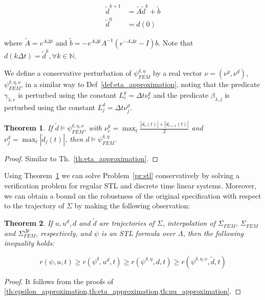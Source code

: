 \documentclass{article}
\newtheorem{theorem}{Theorem}
\newcommand*{\N}{\mathbb{N}}
\newcommand{\Always}{\mathbf{G}}
\begin{document}
\begin{equation}
    \begin{aligned}
        \tilde d^{k+1} &= \tilde A \tilde d^k + \tilde b \\
        \tilde d^0 &= d(0)
    \end{aligned}
\end{equation}

where $\tilde A = e^{A \Delta t}$ and $\tilde b = - e^{A \Delta t} A^{-1} \left
( e^{- A \Delta t} - I \right ) b$. Note that $d(k \Delta t) = \tilde d^k,
\forall k \in \N$. 

We define a conservative perturbation of $\psi^{\delta, \eta}_{FEM}$ by a real
vector $\nu = (\nu^y, \nu^d)$, $\psi^{\delta, \eta, \nu}_{FEM}$, in a similar
way to Def~\ref{def:eta_approximation}, noting that the predicate $\gamma_{\lambda, e}$ is perturbed
using the constant $L_e^y = \Delta t \nu^y_e$ and the predicate $\beta_{\lambda, j}$ is
perturbed using the constant $L_j^d = \Delta t \nu^d_j$.

\begin{theorem}
    \label{th:nu_approximation}
    If $\tilde d \models \psi^{\delta, \eta, \nu}_{FEM}$, with
    $\nu^y_e = \max_t \frac{|\dot d_e(t)| + |\dot d_{e+1}(t)|}{2}$ and $\nu^d_j = \max_t
    |\dot d_j(t)|$, then $d \models \psi^{\delta, \eta}_{FEM}$.
\end{theorem}
\begin{proof}
    Similar to Th.~\ref{th:eta_approximation}.
\end{proof}

Using Theorem~\ref{th:nu_approximation} we can solve Problem~\ref{pr:stl}
conservatively by solving a verification problem for regular STL and discrete
time linear systems. Moreover, we can obtain a bound on the robustness of the
original specification with respect to the trajectory of $\Sigma$ by making the
following observation:

\begin{theorem}
    \label{th:robustness}
    If $u, u^d, d$ and $\tilde{d}$ are trajectories of $\Sigma$, interpolation
    of $\Sigma_{FEM}$, $\Sigma_{FEM}$ and $\Sigma_{FEM}^{\Delta t}$,
    respectively, and $\psi$ is an STL formula over $\Lambda$, then the 
    following inequality holds:

    \begin{equation}
        r(\psi, u, t) \geq r(\psi^{\delta}, u^d, t) \geq r(\psi^{\delta, \eta},
        d, t) \geq r(\psi^{\delta, \eta, \nu}, \tilde{d}, t)
    \end{equation}
\end{theorem}
\begin{proof}
    It follows from the proofs of
    \cref{th:epsilon_approximation,th:eta_approximation,th:nu_approximation}.
\end{proof}
\end{document}
